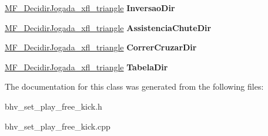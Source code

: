 \begin{DoxyCompactItemize}
\item 
\hypertarget{classTP__DecidirJogada__Jogada_a725f4d8b889893ada26cf32d5f1394b7}{
\hyperlink{classMF__DecidirJogada__xfl__triangle}{MF\_\-DecidirJogada\_\-xfl\_\-triangle} {\bfseries InversaoDir}}
\label{classTP__DecidirJogada__Jogada_a725f4d8b889893ada26cf32d5f1394b7}

\item 
\hypertarget{classTP__DecidirJogada__Jogada_abcd62bcc503b0f131d9be0d0d076ce77}{
\hyperlink{classMF__DecidirJogada__xfl__triangle}{MF\_\-DecidirJogada\_\-xfl\_\-triangle} {\bfseries AssistenciaChuteDir}}
\label{classTP__DecidirJogada__Jogada_abcd62bcc503b0f131d9be0d0d076ce77}

\item 
\hypertarget{classTP__DecidirJogada__Jogada_a4f3f0aba61e0a8e5b466255792d93b92}{
\hyperlink{classMF__DecidirJogada__xfl__triangle}{MF\_\-DecidirJogada\_\-xfl\_\-triangle} {\bfseries CorrerCruzarDir}}
\label{classTP__DecidirJogada__Jogada_a4f3f0aba61e0a8e5b466255792d93b92}

\item 
\hypertarget{classTP__DecidirJogada__Jogada_ad21f6974e05c96fc539cc1981206cff6}{
\hyperlink{classMF__DecidirJogada__xfl__triangle}{MF\_\-DecidirJogada\_\-xfl\_\-triangle} {\bfseries TabelaDir}}
\label{classTP__DecidirJogada__Jogada_ad21f6974e05c96fc539cc1981206cff6}

\end{DoxyCompactItemize}


The documentation for this class was generated from the following files:\begin{DoxyCompactItemize}
\item 
bhv\_\-set\_\-play\_\-free\_\-kick.h\item 
bhv\_\-set\_\-play\_\-free\_\-kick.cpp\end{DoxyCompactItemize}
